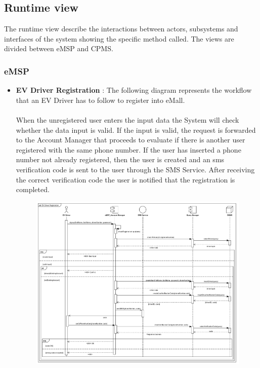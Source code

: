 \pagebreak
\subsection{Runtime view}
The runtime view describe the interactions between actors, subsystems and interfaces of the system showing the specific method called.
The views are divided between eMSP and CPMS.

\subsubsection{eMSP}
\begin{itemize}
    \item \textbf{EV Driver Registration} : The following diagram represents the workflow that an EV Driver has to follow to register into eMall.\\
          \\When the unregistered user enters the input data the System will check whether the data input is valid. If the input is valid,
          the request is forwarded to the Account Manager that proceeds to evaluate if there is another user registered with
          the same phone number. If the user has inserted a phone number not already registered, then the user is created and an sms verification
          code is sent to the user through the SMS Service. After receiving the correct verification code the user is notified that the
          registration is completed.
          \begin{figure}[H]
              \centering
              \includegraphics[scale=0.55]{src/runtimeView/eMSP_Registration.pdf}

\end{figure}
\end{itemize}
